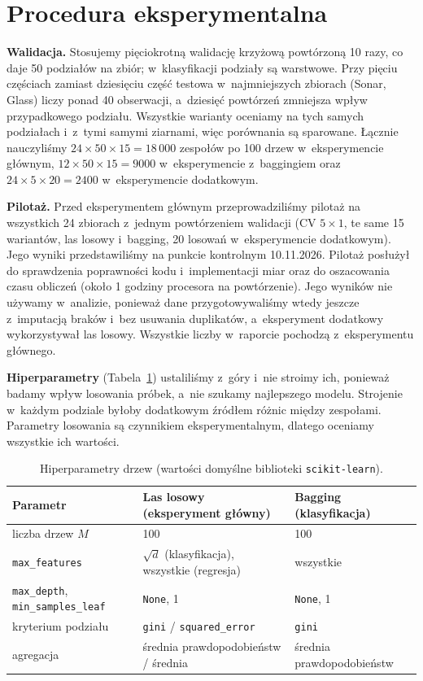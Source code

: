 \documentclass[11pt,a4paper]{article}
\begin{document}
\section{Procedura eksperymentalna}
\label{sec:procedura}

\textbf{Walidacja.} Stosujemy pięciokrotną walidację krzyżową powtórzoną 10 razy, co daje 50 podziałów na zbiór; w~klasyfikacji podziały są warstwowe. Przy pięciu częściach zamiast dziesięciu część testowa w~najmniejszych zbiorach (Sonar, Glass) liczy ponad 40 obserwacji, a~dziesięć powtórzeń zmniejsza wpływ przypadkowego podziału. Wszystkie warianty oceniamy na tych samych podziałach i~z~tymi samymi ziarnami, więc porównania są sparowane. Łącznie nauczyliśmy $24\times50\times15=18\,000$ zespołów po 100 drzew w~eksperymencie głównym, $12\times50\times15=9000$ w~eksperymencie z~baggingiem oraz $24\times5\times20=2400$ w~eksperymencie dodatkowym.

\textbf{Pilotaż.} Przed eksperymentem głównym przeprowadziliśmy pilotaż na wszystkich 24 zbiorach z~jednym powtórzeniem walidacji (CV $5\times1$, te same 15 wariantów, las losowy i~bagging, 20 losowań w~eksperymencie dodatkowym). Jego wyniki przedstawiliśmy na punkcie kontrolnym 10.11.2026. Pilotaż posłużył do sprawdzenia poprawności kodu i~implementacji miar oraz do oszacowania czasu obliczeń (około 1 godziny procesora na powtórzenie). Jego wyników nie używamy w~analizie, ponieważ dane przygotowywaliśmy wtedy jeszcze z~imputacją braków i~bez usuwania duplikatów, a~eksperyment dodatkowy wykorzystywał las losowy. Wszystkie liczby w~raporcie pochodzą z~eksperymentu głównego.

\textbf{Hiperparametry} (Tabela~\ref{tab:hiper}) ustaliliśmy z~góry i~nie stroimy ich, ponieważ badamy wpływ losowania próbek, a~nie szukamy najlepszego modelu. Strojenie w~każdym podziale byłoby dodatkowym źródłem różnic między zespołami. Parametry losowania są czynnikiem eksperymentalnym, dlatego oceniamy wszystkie ich wartości.

\begin{table}[!htbp]
\centering\small
\setlength{\tabcolsep}{4pt}
\caption{Hiperparametry drzew (wartości domyślne biblioteki \texttt{scikit-learn}).}
\label{tab:hiper}
\begin{tabular}{lll}
\toprule
\textbf{Parametr} & \textbf{Las losowy (eksperyment główny)} & \textbf{Bagging (klasyfikacja)} \\
\midrule
liczba drzew $M$ & 100 & 100 \\
\texttt{max\_features} & $\sqrt{d}$ (klasyfikacja), wszystkie (regresja) & wszystkie \\
\texttt{max\_depth}, \texttt{min\_samples\_leaf} & \texttt{None}, 1 & \texttt{None}, 1 \\
kryterium podziału & \texttt{gini} / \texttt{squared\_error} & \texttt{gini} \\
agregacja & średnia prawdopodobieństw / średnia & średnia prawdopodobieństw \\
\bottomrule
\end{tabular}
\end{table}
\end{document}
